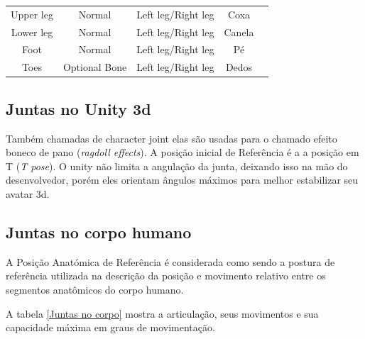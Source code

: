 \begin{table}[]
\begin{tabular}{|c|c|c|c|c}
Upper leg                    & Normal                       & Left leg/Right leg            & Coxa                                &  \\ \cline{1-4}
Lower leg                    & Normal                       & Left leg/Right leg            & Canela                              &  \\ \cline{1-4}
Foot                         & Normal                       & Left leg/Right leg            & Pé                                  &  \\ \cline{1-4}
Toes                         & Optional Bone                & Left leg/Right leg            & Dedos                                  &  \\ \cline{1-4}
\end{tabular}
\end{table} 

\subsection{Juntas no Unity 3d}
\label{Sec:Juntas no Unity 3d}
  Também chamadas de character joint elas são usadas para o chamado efeito 
boneco de pano (\textit{ragdoll effects}). A posição inicial de Referência é a 
a posição em T (\textit{T pose}). O unity não limita a angulação da junta, 
deixando isso na mão do desenvolvedor, porém eles orientam ângulos máximos 
para melhor estabilizar seu avatar 3d.\cite{unity3dManual}

\subsection{Juntas no corpo humano}
\label{Sec:Juntas no corpo humano}
  A Posição Anatómica de Referência é considerada como sendo a postura de 
referência utilizada na descrição da posição e movimento relativo entre os 
segmentos anatômicos do corpo humano.

  A tabela \ref{Juntas no corpo} mostra a articulação, seus movimentos e sua capacidade máxima em
graus de movimentação.

